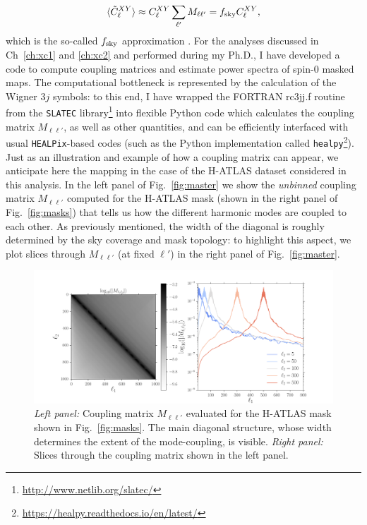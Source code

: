 %
\begin{equation}
\label{eqn:fsky_app}
\langle \tilde{C}^{XY}_{\ell}\rangle \approx  C^{XY}_{\ell}  \sum_{\ell'} M_{\ell\ell'} = f_{\rm{sky}} C^{XY}_{\ell},
\end{equation}
%
which is the so-called $f_{\rm{sky}}$ approximation \citep{Komatsu2002a}. For the analyses discussed in Ch~\eqref{ch:xc1} and \eqref{ch:xc2} and performed during my Ph.D., I have developed a code to compute coupling matrices and estimate power spectra of spin-0 masked maps. The computational bottleneck is represented by the calculation of the Wigner $3j$ symbols: to this end, I have wrapped the FORTRAN rc3jj.f routine from the \texttt{SLATEC} library\footnote{\url{http://www.netlib.org/slatec/}} into flexible Python code which calculates the coupling matrix $M_{\ell\ell'}$, as well as other quantities, and can be efficiently interfaced with usual \texttt{HEALPix}-based codes (such as the Python implementation called \texttt{healpy}\footnote{\url{https://healpy.readthedocs.io/en/latest/}}). Just as an illustration and example of how a coupling matrix can appear, we anticipate here the mapping in the case of the H-ATLAS dataset considered in this analysis.
In the left panel of Fig.~\eqref{fig:master} we show the \textit{unbinned} coupling matrix $M_{\ell\ell'}$ computed for the H-ATLAS mask (shown in the right panel of Fig.~\eqref{fig:masks}) that tells us how the different harmonic modes are coupled to each other. As previously mentioned, the width of the diagonal is roughly determined by the sky coverage and mask topology: to highlight this aspect, we plot slices through $M_{\ell\ell'}$ (at fixed $\ell'$) in the right panel of Fig.~\eqref{fig:master}.

\begin{figure} %
\centering %
\includegraphics[width=\textwidth]{Chapter2/Images/master}
\caption{\emph{Left panel:} Coupling matrix $M_{\ell\ell'}$ evaluated for the H-ATLAS mask shown in Fig.~\eqref{fig:masks}. The main diagonal structure, whose width determines the extent of the mode-coupling, is visible. \emph{Right panel:} Slices through the coupling matrix shown in the left panel. \label{fig:master}}
\end{figure}

